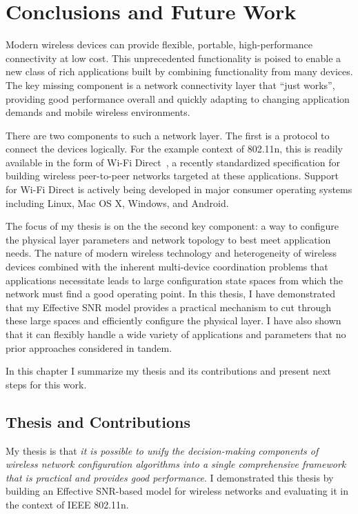 \ifx\mainfile\undefined

\setcounter{chapter}{9} %
\fi

\cleardoublepage
\chapter{Conclusions and Future Work}
\label{chap:conclusion}

Modern wireless devices can provide flexible, portable, high-performance connectivity at low cost. This unprecedented functionality is poised to enable a new class of rich applications built by combining functionality from many devices. The key missing component is a network connectivity layer that ``just works'', providing good performance overall and quickly adapting to changing application demands and mobile wireless environments.

There are two components to such a network layer. The first is a protocol to connect the devices logically. For the example context of 802.11n, this is readily available in the form of Wi-Fi Direct~\cite{wifi_direct}, a recently standardized specification for building wireless peer-to-peer networks targeted at these applications. Support for Wi-Fi Direct is actively being developed in major consumer operating systems including Linux, Mac OS X, Windows, and Android.

The focus of my thesis is on the the second key component: a way to configure the physical layer parameters and network topology to best meet application needs. The nature of modern wireless technology and heterogeneity of wireless devices combined with the inherent multi-device coordination problems that applications necessitate leads to large configuration state spaces from which the network must find a good operating point. In this thesis, I have demonstrated that my Effective SNR model provides a practical mechanism to cut through these large spaces and efficiently configure the physical layer. I have also shown that it can flexibly handle a wide variety of applications and parameters that no prior approaches considered in tandem.

In this chapter I summarize my thesis and its contributions and present next steps for this work.

\section{Thesis and Contributions}
My thesis is that \emph{it is possible to unify the decision-making components of wireless network configuration algorithms into a single comprehensive framework that is practical and provides good performance}. I demonstrated this thesis by building an Effective SNR-based model for wireless networks and evaluating it in the context of IEEE 802.11n.

